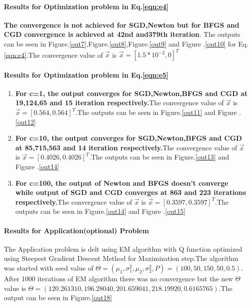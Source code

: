 \documentclass[paper=a4, fontsize=11pt]{scrartcl}
\numberwithin{equation}{section}		%
\numberwithin{figure}{section}			%
\numberwithin{table}{section}				%
\begin{document}
\paragraph{Results for Optimization problem in Eq.\ref{eqn:e4}\newline}
\textbf{The convergence is not achieved for SGD,Newton but for BFGS and CGD convergence is achieved at 42nd and379th iteration}. The outputs can be seen in Figure.\ref{out7},Figure.\ref{out8},Figure.\ref{out9} and Figure .\ref{out10} for Eq.\ref{eqn:e4}.The convergence value of $\vec{x}$ is $\vec{x}=[1.5*10^{-2},0]^T$
\paragraph{Results for Optimization problem in Eq.\ref{eqn:e5}\newline}
\begin{enumerate}
  \item \textbf{For c=1, the output converges for SGD,Newton,BFGS and CGD at 19,124,65 and 15 iteration respectively.}The convergence value of $\vec{x}$ is $\vec{x}=[0.564,0.564]^T$.The outputs can be seen in Figure.\ref{out11} and Figure .\ref{out12}
  \item \textbf{For c=10, the output converges for SGD,Newton,BFGS and CGD at 85,715,563 and 14 iteration respectively.}The convergence value of $\vec{x}$ is $\vec{x}=[0.4026,0.4026]^T$.The outputs can be seen in Figure.\ref{out13} and Figure .\ref{out14}
  \item \textbf{For c=100, the output of Newton and BFGS doesn't converge while output of SGD and CGD converges at 863 and 223 iterations respectively.}The convergence value of $\vec{x}$ is $\vec{x}=[0.3597,0.3597]^T$.The outputs can be seen in Figure.\ref{out14} and Figure .\ref{out15}
\end{enumerate}
\paragraph{Results for Application(optional) Problem\newline}
The Application problem is delt using EM algorithm with Q function optimized using Steepest Gradient Descent Method for Maximization step.The algorithm was started with seed value of $\Theta=(\mu_1,\sigma_1^2,\mu_2,\sigma_2^2,P)=(100,50,150,50,0.5)$. After 1000 iterations of EM algorithm there was no convergence but the new $\Theta$ value is  $\Theta=(120.261310,196.28040,201.659041,218.19920,0.6165765)$.The output can be seen in Figure.\ref{out18}
\end{document}
